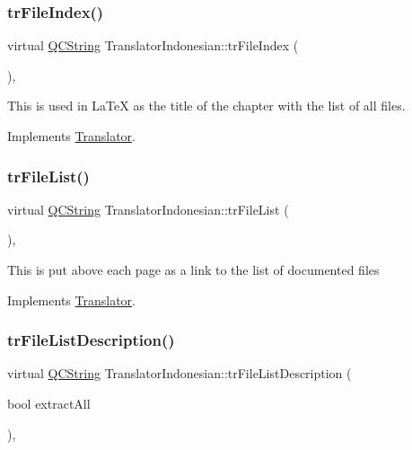 \subsubsection{\texorpdfstring{trFileIndex()}{trFileIndex()}}
{\footnotesize\ttfamily virtual \mbox{\hyperlink{class_q_c_string}{Q\+C\+String}} Translator\+Indonesian\+::tr\+File\+Index (\begin{DoxyParamCaption}{ }\end{DoxyParamCaption})\hspace{0.3cm}{\ttfamily [inline]}, {\ttfamily [virtual]}}

This is used in La\+TeX as the title of the chapter with the list of all files. 

Implements \mbox{\hyperlink{class_translator}{Translator}}.

\mbox{\label{class_translator_indonesian_a791ee49084a54d1e34961e3a2eb196e2}} 
\subsubsection{\texorpdfstring{trFileList()}{trFileList()}}
{\footnotesize\ttfamily virtual \mbox{\hyperlink{class_q_c_string}{Q\+C\+String}} Translator\+Indonesian\+::tr\+File\+List (\begin{DoxyParamCaption}{ }\end{DoxyParamCaption})\hspace{0.3cm}{\ttfamily [inline]}, {\ttfamily [virtual]}}

This is put above each page as a link to the list of documented files 

Implements \mbox{\hyperlink{class_translator}{Translator}}.

\mbox{\label{class_translator_indonesian_a7f7c441b30c7836e3809812ebfea786d}} 
\subsubsection{\texorpdfstring{trFileListDescription()}{trFileListDescription()}}
{\footnotesize\ttfamily virtual \mbox{\hyperlink{class_q_c_string}{Q\+C\+String}} Translator\+Indonesian\+::tr\+File\+List\+Description (\begin{DoxyParamCaption}\item[{bool}]{extract\+All }\end{DoxyParamCaption})\hspace{0.3cm}{\ttfamily [inline]}, {\ttfamily [virtual]}}

